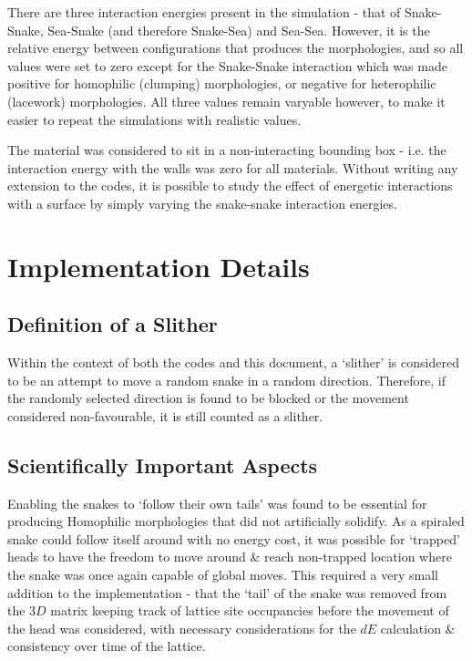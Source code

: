 \documentclass[twocolumn,a4,notitlepage]{report}
\begin{document}
There are three interaction energies present in the simulation - that of
Snake-Snake, Sea-Snake (and therefore Snake-Sea) and Sea-Sea. However, it is
the relative energy between configurations that produces the morphologies,
and so all values were set to zero except for the Snake-Snake interaction
which was made positive for homophilic (clumping) morphologies, or negative
for heterophilic (lacework) morphologies. All three values remain varyable
however, to make it easier to repeat the simulations with realistic values.

The material was considered to sit in a non-interacting bounding box - i.e.
the interaction energy with the walls was zero for all materials. Without
writing any extension to the codes, it is possible to study the effect of
energetic interactions with a surface by simply varying the snake-snake
interaction energies.

\section{Implementation Details}

\subsection{Definition of a Slither}
Within the context of both the codes and this document, a `slither' is
considered to be an attempt to move a random snake in a random direction.
Therefore, if the randomly selected direction is found to be blocked or the
movement considered non-favourable, it is still counted as a slither.

\subsection{Scientifically Important Aspects}

Enabling the snakes to `follow their own tails' was found to be essential
for producing Homophilic morphologies that did not artificially solidify. As
a spiraled snake could follow itself around with no energy cost, it was
possible for `trapped' heads to have the freedom to move around \& reach
non-trapped location where the snake was once again capable of global moves.
This required a very small addition to the implementation - that the `tail'
of the snake was removed from the $3D$ matrix keeping track of lattice site
occupancies before the movement of the head was considered, with necessary
considerations for the $dE$ calculation \& consistency over time of the
lattice.
\end{document}
